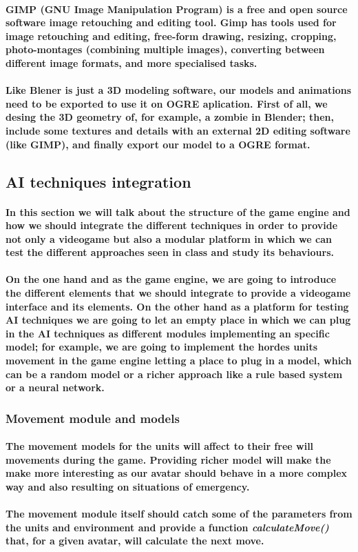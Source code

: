 \documentclass[a4paper,10pt]{article}
\newcommand{\p}[1]{\paragraph{\indent\textnormal{#1}}}
\begin{document}
    \p{\textbf{GIMP} (GNU Image Manipulation Program) is a free and open source software image retouching and editing tool. Gimp has tools used for image retouching and editing, free-form drawing, resizing, cropping, photo-montages (combining multiple images), converting between different image formats, and more specialised tasks. }

    \p{Like Blener is just a 3D modeling software, our models and animations need to be exported to use it on OGRE aplication. First of all, we desing the 3D geometry of, for example, a zombie in Blender; then, include some textures and details with an external 2D editing software (like GIMP), and finally export our model to a OGRE format.}

  \subsection{AI techniques integration}

  \p{In this section we will talk about the structure of the game engine and how we should integrate the different techniques in order to provide not only a videogame but also a modular platform in which we can test the different approaches seen in class and study its behaviours.}

  \p{On the one hand and as the game engine, we are going to introduce the different elements that we should integrate to provide a videogame interface and its elements. On the other hand as a platform for testing AI techniques we are going to let an empty place in which we can plug in the AI techniques as different modules implementing an specific model; for example, we are going to implement the hordes units movement in the game engine letting a place to plug in a model, which can be a random model or a richer approach like a rule based system or a neural network.}
  
  \subsubsection{Movement module and models}
    
    \p{The movement models for the units will affect to their free will movements during the game. Providing richer model will make the make more interesting as our avatar should behave in a more complex way and also resulting on situations of emergency.}

    \p{The movement module itself should catch some of the parameters from the units and environment and provide a function \textit{calculateMove()} that, for a given avatar, will calculate the next move.}
\end{document}
